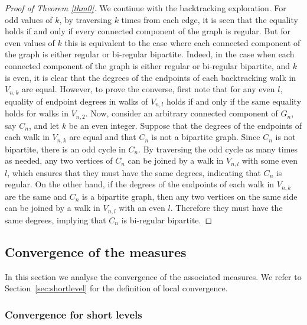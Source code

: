 \documentclass[11pt]{article}
\numberwithin{equation}{section}
\theoremstyle{plain}
\begin{document}
\begin{proof}[Proof of Theorem \ref{thm0}]
We continue with the backtracking exploration. For odd values of $k$, by traversing $k$ times from each edge, it is seen that the equality holds if and only if every connected component of the graph is regular. But for even values of $k$ this is equivalent to the case where each connected component of the graph is either regular or bi-regular bipartite. Indeed, in the case when each connected component of the graph is either regular or bi-regular bipartite, and $k$ is even, it is clear that the degrees of the endpoints of each backtracking walk in $V_{n,k}$ are equal. However, to prove the converse, first note that for any even $l$, equality of endpoint degrees in walks of $V_{n,l}$ holds if and only if the same equality holds for walks in $V_{n,2}$. Now, consider an arbitrary connected component of $G_{n}$, say $C_n$, and let $k$ be an even integer. Suppose that the degrees of the endpoints of each walk in $V_{n,k}$ are equal and that $C_{n}$ is not a bipartite graph. Since $C_{n}$ is not bipartite, there is an odd cycle in $C_{n}$. By traversing the odd cycle as many times as needed, any two vertices of $C_{n}$ can be joined by a walk in $V_{n,l}$ with some even $l$, which ensures that they must have the same degrees, indicating that $C_{n}$ is regular. On the other hand, if the degrees of the endpoints of each walk in $V_{n,k}$ are the same and $C_{n}$ is a bipartite graph, then any two vertices on the same side can be joined by a walk in $V_{n,l}$ with an even $l$. Therefore they must have the same degrees, implying that $C_{n}$ is bi-regular bipartite.
\end{proof}


\subsection{Convergence of the measures}
\label{ss:cv}
In this section we analyse the convergence of the associated measures. We refer to Section~\ref{sec:shortlevel} for the definition of local convergence.



\subsubsection{Convergence for short levels}
\end{document}
